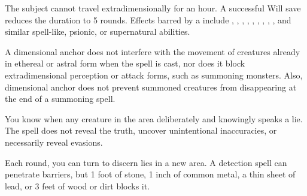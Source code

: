 \spellrng{\rngmed}
\begin{spelleffect}
  The subject cannot travel extradimensionally for an hour. A successful Will save reduces the duration to 5 rounds. Effects barred by a  include , , , , , , , , , and similar spell-like, psionic, or supernatural abilities.
\end{spelleffect}
\begin{spellnotes}
  A dimensional anchor does not interfere with the movement of creatures already in ethereal or astral form when the spell is cast, nor does it block extradimensional perception or attack forms, such as summoning monsters. Also, dimensional anchor does not prevent summoned creatures from disappearing at the end of a summoning spell. 
\end{spellnotes}

\begin{spelleffect}
  You know when any creature in the area deliberately and knowingly speaks a lie. The spell does not reveal the truth, uncover unintentional inaccuracies, or necessarily reveal evasions.
\end{spelleffect}
\begin{spellnotes}
  Each round, you can turn to discern lies in a new area. A detection spell can penetrate barriers, but 1 foot of stone, 1 inch of common metal, a thin sheet of lead, or 3 feet of wood or dirt blocks it.
\end{spellnotes}

